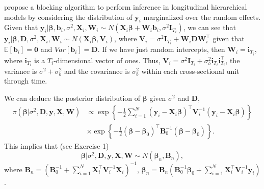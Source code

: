 \cite{Chib1999} propose a blocking algorithm to perform inference in longitudinal hierarchical models by considering the distribution of $\bm{y}_i$ marginalized over the random effects. Given that $\bm{y}_i| \bm{\beta},\bm{b}_i,\sigma^2,\bm{X}_i,\bm{W}_i\sim N(\bm{X}_i\bm{\beta}+\bm{W}_i\bm{b}_i,\sigma^2\bm{I}_{T_i})$, we can see that    $\bm{y}_i|\bm{\beta},\bm{D},\sigma^2,\bm{X}_i,\bm{W}_i\sim{N}(\bm{X}_i\bm{\beta},\bm{V}_i)$, where $\bm{V}_i=\sigma^2\bm{I}_{T_i}+\bm{W}_i\bm{D}\bm{W}_i^{\top}$ given that $\mathbb{E}[\bm{b}_i]=\bm{0}$ and $Var[\bm{b}_i]=\bm{D}$. If we have just random intercepts, then $\bm{W}_i=\bm{i}_{T_i}$, where $\bm{i}_{T_i}$ is a $T_i$-dimensional vector of ones. Thus, $\bm{V}_i=\sigma^2\bm{I}_{T_i}+\sigma_{b}^2\bm{i}_{T_i}\bm{i}_{T_i}^{\top}$, the variance is $\sigma^2+\sigma^2_{b}$ and the covariance is $\sigma^2_{b}$ within each cross-sectional unit through time.

We can deduce the posterior distribution of $\bm{\beta}$ given $\sigma^2$ and $\bm{D}$,
\begin{align*}
	\pi(\bm{\beta}|\sigma^2, \bm{D},\bm{y}, \bm{X}, \bm{W}) & \propto \exp\left\{-\frac{1}{2}\sum_{i=1}^N(\bm{y}_i-\bm{X}_i\bm{\beta})^{\top}\bm{V}_i^{-1}(\bm{y}_i-\bm{X}_i\bm{\beta})\right\}\\
	&\times \exp\left\{-\frac{1}{2}(\bm{\beta}-\bm{\beta}_0)^{\top}\bm{B}_0^{-1}(\bm{\beta}-\bm{\beta}_0)\right\}.
\end{align*} 
This implies that (see Exercise 1)  
\begin{equation*}
	\bm{\beta}|\sigma^2,\bm{D},\bm{y}, \bm{X}, \bm{W} \sim {N}(\bm{\beta}_n,\bm{B}_n), 
\end{equation*}
where $\bm{B}_n = (\bm{B}_0^{-1} +\sum_{i=1}^N \bm{X}_i^{\top}\bm{V}_i^{-1}\bm{X}_i)^{-1}$, $\bm{\beta}_n= \bm{B}_n(\bm{B}_0^{-1}\bm{\beta}_0 + \sum_{i=1}^N\bm{X}_i^{\top}\bm{V}_i^{-1}\bm{y}_i)$.


